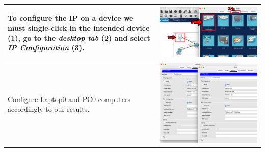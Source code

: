 \documentclass[11pt,a4paper]{report}
\begin{document}
\begin{flushleft}
\begin{center}
\begin{longtable}{ m{5cm} l }
                        To configure the IP on a device we must \textbf{single-click} in the intended device (1), go to the \textit{desktop tab} (2) and select \textit{IP Configuration} (3).                                                                                                                                                                                                                      & \includegraphics[scale=0.35 ,valign=c]{p1-connectingdevices/CiscoPacketTracer_configIP}   \\ \hline
                        Configure Laptop0 and PC0 computers accordingly to our results.                                                                                                                                                                                                                                                                                                                             & \includegraphics[scale=0.34 ,valign=c]{p2-connecting2lanswithrouter/Laptop0PC0_ip}        \\ \hline

\end{longtable}
\end{center}
\end{flushleft}
\end{document}
